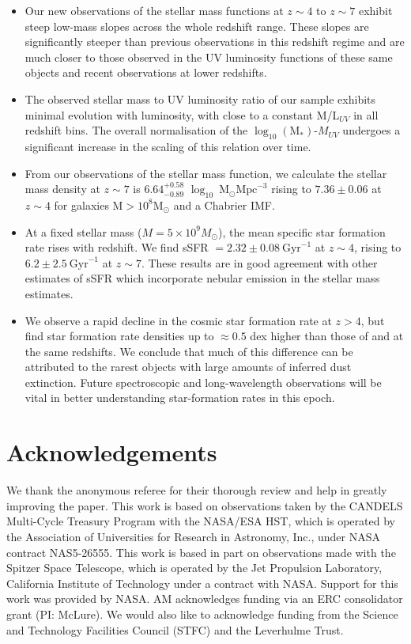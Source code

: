 \begin{itemize}
  \item Our new observations of the stellar mass functions at $z \sim 4$ to $z \sim 7$ exhibit steep low-mass slopes across the whole redshift range. These slopes are significantly steeper than previous observations in this redshift regime and are much closer to those observed in the UV luminosity functions of these same objects and recent observations at lower redshifts.  
  \item The observed stellar mass to UV luminosity ratio of our sample exhibits minimal evolution with luminosity, with close to a constant M/L$_{UV}$ in all redshift bins. The overall normalisation of the $\log_{10} (\text{M}_{*})$-$M_{UV}$ undergoes a significant increase in the scaling of this relation over time.
  \item From our observations of the stellar mass function, we calculate the stellar mass density at $z \sim 7$ is $6.64^{+0.58}_{-0.89}$ $\log_{10}~\text{M}_{\odot} \text{Mpc}^{-3}$ rising to $7.36\pm0.06$ at $z \sim 4$ for galaxies M$> 10^8 \text{M}_{\odot}$ and a Chabrier IMF.
  \item At a fixed stellar mass ($M = 5 \times 10^9 M_{\odot}$), the mean specific star formation rate rises with redshift. We find sSFR $= 2.32\pm0.08~\text{Gyr}^{-1}$ at $z \sim 4$, rising to $6.2\pm2.5~\text{Gyr}^{-1}$ at $z \sim 7$. These results are in good agreement with other estimates of sSFR which incorporate nebular emission in the stellar mass estimates. 
  \item We observe a rapid decline in the cosmic star formation rate at $z > 4$, but find star formation rate densities up to $\approx 0.5$ dex higher than those of \citet{2012ApJ...754...83B} and \citet{Smit:2012is} at the same redshifts. We conclude that much of this difference can be attributed to the rarest objects with large amounts of inferred dust extinction. Future spectroscopic and long-wavelength observations will be vital in better understanding star-formation rates in this epoch. 
\end{itemize}

\section*{Acknowledgements}
We thank the anonymous referee for their thorough review and help in greatly improving the paper. This work is based on observations taken by the CANDELS Multi-Cycle Treasury Program with the NASA/ESA HST, which is operated by the Association of Universities for Research in Astronomy, Inc., under NASA contract NAS5-26555. This work is based in part on observations made with the Spitzer Space Telescope, which is operated by the Jet Propulsion Laboratory, California Institute of Technology under a contract with NASA. Support for this work was provided by NASA. AM acknowledges funding via an ERC consolidator grant (PI: McLure). We would also like to acknowledge funding from the Science and Technology Facilities Council (STFC) and the Leverhulme Trust. 


